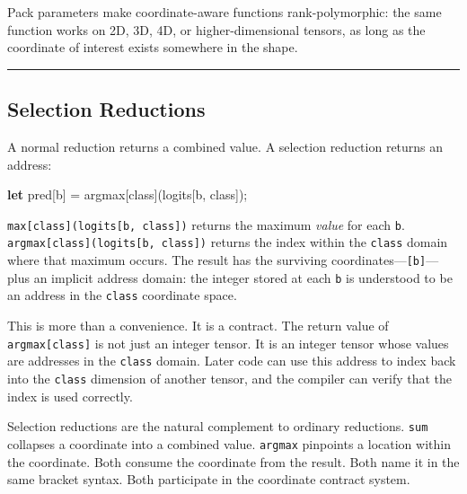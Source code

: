 \documentclass[11pt,]{article}
\newenvironment{Shaded}{}{}
\newcommand{\KeywordTok}[1]{\textcolor[rgb]{0.00,0.44,0.13}{\textbf{#1}}}
\newcommand{\NormalTok}[1]{#1}
\newcommand{\OperatorTok}[1]{\textcolor[rgb]{0.40,0.40,0.40}{#1}}
\begin{document}
Pack parameters make coordinate-aware functions rank-polymorphic: the
same function works on 2D, 3D, 4D, or higher-dimensional tensors, as
long as the coordinate of interest exists somewhere in the shape.

\begin{center}\rule{0.5\linewidth}{0.4pt}\end{center}

\hypertarget{selection-reductions}{%
\subsection{Selection Reductions}\label{selection-reductions}}

A normal reduction returns a combined value. A selection reduction
returns an address:

\begin{Shaded}
\begin{Highlighting}[]
\KeywordTok{let}\NormalTok{ pred}\OperatorTok{[}\NormalTok{b}\OperatorTok{]}\NormalTok{ = argmax}\OperatorTok{[}\NormalTok{class}\OperatorTok{]}\NormalTok{(logits}\OperatorTok{[}\NormalTok{b, class}\OperatorTok{]}\NormalTok{);}
\end{Highlighting}
\end{Shaded}

\texttt{max{[}class{]}(logits{[}b,\ class{]})} returns the maximum
\emph{value} for each \texttt{b}.
\texttt{argmax{[}class{]}(logits{[}b,\ class{]})} returns the index
within the \texttt{class} domain where that maximum occurs. The result
has the surviving coordinates---\texttt{{[}b{]}}---plus an implicit
address domain: the integer stored at each \texttt{b} is understood to
be an address in the \texttt{class} coordinate space.

This is more than a convenience. It is a contract. The return value of
\texttt{argmax{[}class{]}} is not just an integer tensor. It is an
integer tensor whose values are addresses in the \texttt{class} domain.
Later code can use this address to index back into the \texttt{class}
dimension of another tensor, and the compiler can verify that the index
is used correctly.

Selection reductions are the natural complement to ordinary reductions.
\texttt{sum} collapses a coordinate into a combined value.
\texttt{argmax} pinpoints a location within the coordinate. Both consume
the coordinate from the result. Both name it in the same bracket syntax.
Both participate in the coordinate contract system.
\end{document}
